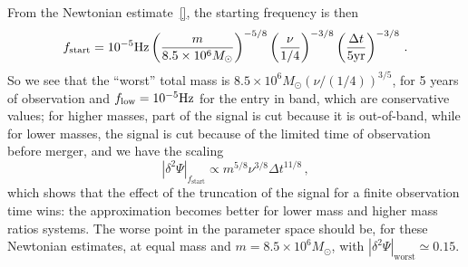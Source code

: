 \documentclass[aps,showpacs,twocolumn,
prd,superscriptaddress,nofootinbib]{revtex4-1}
\newcommand{\be}{\begin{equation}}
\newcommand{\ee}{\end{equation}}
\newcommand{\Msol}{M_{\odot}}
\begin{document}
From the Newtonian estimate~\eqref{}, the starting frequency is then
%
\be
	f_{\rm start} = 10^{-5}\mathrm{Hz} \left( \frac{m}{8.5\times10^{6}\Msol} \right)^{-5/8} \left( \frac{\nu}{1/4} \right)^{-3/8} \left( \frac{\Delta t}{5 \mathrm{yr}} \right)^{-3/8} \,.
\ee
%
So we see that the ``worst'' total mass is $8.5\times10^6\Msol (\nu/(1/4))^{3/5}$, for 5 years of observation and $f_{\rm low} = 10^{-5}\mathrm{Hz}$ for the entry in band, which are conservative values; for higher masses, part of the signal is cut because it is out-of-band, while for lower masses, the signal is cut because of the limited time of observation before merger, and we have the scaling
%
\be
	|\delta^{2}\Psi |_{f_\mathrm{start}} \propto m^{5/8}\nu^{3/8}\Delta t^{11/8} \,,
\ee
%
which shows that the effect of the truncation of the signal for a finite observation time wins: the approximation becomes better for lower mass and higher mass ratios systems. The worse point in the parameter space should be, for these Newtonian estimates, at equal mass and $m=8.5\times 10^{6} \Msol$, with $|\delta^{2}\Psi |_{\mathrm{worst}} \simeq 0.15$.
\end{document}
